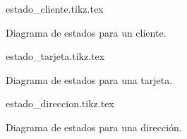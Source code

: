 \begin{figure}
  \begin{center}
    {estado_cliente.tikz.tex}
    \caption{Diagrama de estados para un cliente.}
    \label{lib_fig:estado_cliente}
  \end{center}
\end{figure}

\begin{figure}
  \begin{center}
    {estado_tarjeta.tikz.tex}
    \caption{Diagrama de estados para una tarjeta.}
    \label{lib_fig:estado_tarjeta}
  \end{center}
\end{figure}

\begin{figure}
  \begin{center}
    {estado_direccion.tikz.tex}
    \caption{Diagrama de estados para una dirección.}
    \label{lib_fig:estado_direccion}
  \end{center}
\end{figure}
